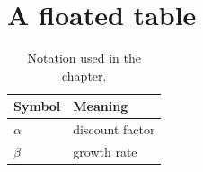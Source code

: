 \section{A floated table}

\begin{table}
\centering
\begin{tabular}{ll}
\hline
Symbol & Meaning \\
\hline
$\alpha$ & discount factor \\
$\beta$ & growth rate \\
\hline
\end{tabular}
\caption{Notation used in the chapter.}
\label{tab:notation}
\end{table}
